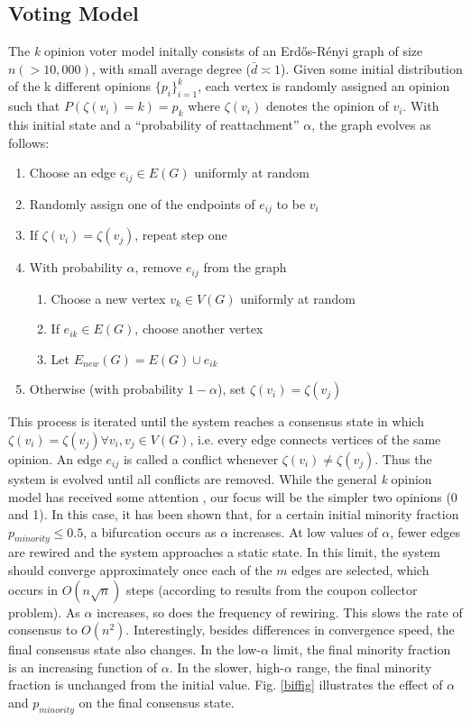 \documentclass[11pt]{article}
\begin{document}
\subsection{Voting Model}
The \textit{k} opinion voter model initally consists of an Erd\H{o}s-R\'{e}nyi graph of size $n(>10,000)$, with small average degree ($\bar{d}\asymp 1$). Given some initial distribution of the k different opinions $\{p_{i}\}_{i=1}^{k}$, each vertex is randomly assigned an opinion such that $P(\zeta(v_{i}) = k) = p_{k}$ where $\zeta(v_{i})$ denotes the opinion of $v_{i}$. With this initial state and a ``probability of reattachment'' $\alpha$, the graph evolves as follows:
\begin{enumerate}
\item Choose an edge $e_{ij} \in E(G)$ uniformly at random
\item Randomly assign one of the endpoints of $e_{ij}$ to be $v_{i}$
\item If $\zeta(v_{i}) = \zeta(v_{j})$, repeat step one
\item With probability $\alpha$, remove $e_{ij}$ from the graph
\begin{enumerate}
\item Choose a new vertex $v_{k} \in V(G)$ uniformly at random
\item If $e_{ik} \in E(G)$, choose another vertex
\item Let $E_{new}(G) = E(G)\cup e_{ik}$
\end{enumerate}
\item Otherwise (with probability $1-\alpha$), set $\zeta(v_{i}) = \zeta(v_{j})$
\end{enumerate}
This process is iterated until the system reaches a consensus state in which $\zeta(v_{i}) = \zeta(v_{j}) \forall v_{i}, v_{j} \in V(G)$, i.e. every edge connects vertices of the same opinion. An edge $e_{ij}$ is called a conflict whenever $\zeta(v_{i}) \ne \zeta(v_{j})$. Thus the system is evolved until all conflicts are removed. While the general \textit{k} opinion model has received some attention \cite{durretts preprint?}, our focus will be the simpler two opinions (0 and 1). In this case, it has been shown that, for a certain initial minority fraction $p_{minority} \le 0.5$, a bifurcation occurs as $\alpha$ increases. At low values of $\alpha$, fewer edges are rewired and the system approaches a static state. In this limit, the system should converge approximately once each of the $m$ edges are selected, which occurs in $O(n\sqrt{n})$ steps (according to results from the coupon collector problem). As $\alpha$ increases, so does the frequency of rewiring. This slows the rate of consensus to $O(n^{2})$. Interestingly, besides differences in convergence speed, the final consensus state also changes. In the low-$\alpha$ limit, the final minority fraction is an increasing function of $\alpha$. In the slower, high-$\alpha$ range, the final minority fraction is unchanged from the initial value. Fig. \ref{biffig} illustrates the effect of $\alpha$ and $p_{minority}$ on the final consensus state.\vspace{1mm}\\
\end{document}
